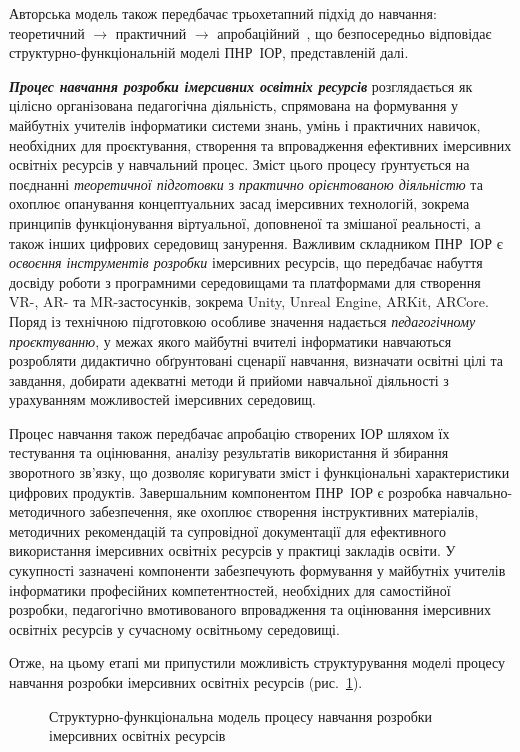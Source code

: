 Авторська модель також передбачає трьохетапний підхід до навчання: теоретичний $\to$ практичний $\to$ апробаційний~\cite{Semerikov2022IERDesign}, що безпосередньо відповідає структурно-функціональній моделі ПНР~ІОР, представленій далі.

\emph{\textbf{Процес навчання розробки імерсивних освітніх ресурсів}} розглядається як цілісно організована педагогічна діяльність, спрямована на формування у майбутніх учителів інформатики системи знань, умінь і практичних навичок, необхідних для проєктування, створення та впровадження ефективних імерсивних освітніх ресурсів у навчальний процес. Зміст цього процесу ґрунтується на поєднанні \emph{теоретичної підготовки} з \emph{практично орієнтованою діяльністю} та охоплює опанування концептуальних засад імерсивних технологій, зокрема принципів функціонування віртуальної, доповненої та змішаної реальності, а також інших цифрових середовищ занурення. Важливим складником ПНР~ІОР є \emph{освоєння інструментів розробки} імерсивних ресурсів, що передбачає набуття досвіду роботи з програмними середовищами та платформами для створення VR-, AR- та MR-застосунків, зокрема Unity, Unreal Engine, ARKit, ARCore. Поряд із технічною підготовкою особливе значення надається \emph{педагогічному проєктуванню}, у межах якого майбутні вчителі інформатики навчаються розробляти дидактично обґрунтовані сценарії навчання, визначати освітні цілі та завдання, добирати адекватні методи й прийоми навчальної діяльності з урахуванням можливостей імерсивних середовищ.

Процес навчання також передбачає апробацію створених ІОР шляхом їх тестування та оцінювання, аналізу результатів використання й збирання зворотного зв'язку, що дозволяє коригувати зміст і функціональні характеристики цифрових продуктів. Завершальним компонентом ПНР~ІОР є розробка навчально-методичного забезпечення, яке охоплює створення інструктивних матеріалів, методичних рекомендацій та супровідної документації для ефективного використання імерсивних освітніх ресурсів у практиці закладів освіти. У сукупності зазначені компоненти забезпечують формування у майбутніх учителів інформатики професійних компетентностей, необхідних для самостійної розробки, педагогічно вмотивованого впровадження та оцінювання імерсивних освітніх ресурсів у сучасному освітньому середовищі.

Отже, на цьому етапі ми припустили можливість структурування моделі процесу навчання розробки імерсивних освітніх ресурсів (рис.~\ref{fig:1.5}).

\begin{figure}[!h]
\centering

\caption{Структурно-функціональна модель процесу навчання розробки імерсивних освітніх ресурсів}
\label{fig:1.5}
\end{figure}

